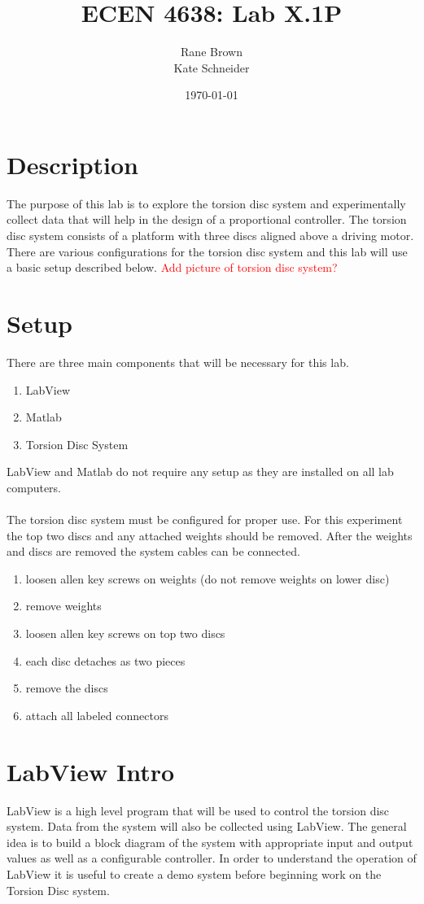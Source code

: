 \documentclass[11pt,titlepage]{article}
\author{Rane Brown \\ Kate Schneider}
\title{ECEN 4638: Lab X.1P}
\date{\today}
\begin{document}
\maketitle

\section{Description}
	The purpose of this lab is to explore the torsion disc system and experimentally collect data that will help in the design of a proportional controller. The torsion disc system consists of a platform with three discs aligned above a driving motor. There are various configurations for the torsion disc system and this lab will use a basic setup described below. 
	\textcolor{red}{Add picture of torsion disc system?}

\section{Setup}
	There are three main components that will be necessary for this lab.
	\begin{enumerate}
		\item LabView
		\item Matlab
		\item Torsion Disc System
	\end{enumerate}
	LabView and Matlab do not require any setup as they are installed on all lab computers. \\\\
	The torsion disc system must be configured for proper use. For this experiment the top two discs and any attached weights should be removed. After the weights and discs are removed the system cables can be connected.
	\begin{enumerate}
		\item loosen allen key screws on weights (do not remove weights on lower disc)
		\item remove weights
		\item loosen allen key screws on top two discs
		\item each disc detaches as two pieces
		\item remove the discs
		\item attach all labeled connectors
	\end{enumerate}

\section{LabView Intro}
	LabView is a high level program that will be used to control the torsion disc system. Data from the system will also be collected using LabView. The general idea is to build a block diagram of the system with appropriate input and output values as well as a configurable controller. In order to understand the operation of LabView it is useful to create a demo system before beginning work on the Torsion Disc system.
\end{document}
